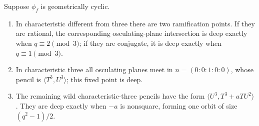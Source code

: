 \begin{lemma}\label{lem:cyclic}%
%
Suppose $\phi_f$ is geometrically cyclic.
\begin{enumerate}[label=\textup{(\roman*)}]
\item In characteristic different from three there are two ramification
      points.  If they are rational, the corresponding osculating-plane
      intersection is deep exactly when $q\equiv2\pmod3$; if they are
      conjugate, it is deep exactly when $q\equiv1\pmod3$.
\item In characteristic three all osculating planes meet in
      $n=(0:0:1:0:0)$, whose pencil is
      $\langle T^3,U^3\rangle$; this fixed point is deep.
\item The remaining wild characteristic-three pencils have the form
      $\langle U^3,T^3+aTU^2\rangle$.  They are deep exactly when $-a$
      is nonsquare, forming one orbit of size $(q^2-1)/2$.
\end{enumerate}
\end{lemma}

